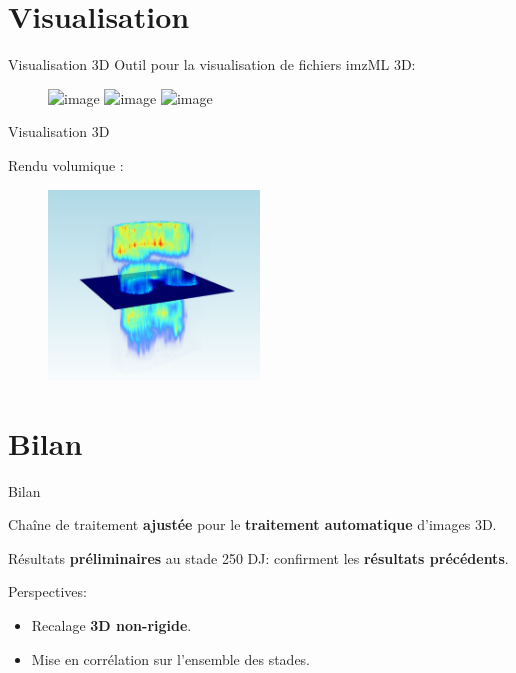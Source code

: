 \documentclass[10pt]{beamer}
\begin{document}
\section{Visualisation}


\begin{frame}{Visualisation 3D}
  Outil pour la visualisation de fichiers imzML 3D:

  \begin{figure}[ht]
    \centering
    \includegraphics<1>[width=0.95\textwidth]{fig/visu}%
    \includegraphics<2>[width=0.95\textwidth]{fig/visu2}%
    \includegraphics<3>[width=0.95\textwidth]{fig/visu3}
    \caption{}
    \label{fig:visu}
  \end{figure}

\end{frame}

\begin{frame}{Visualisation 3D}
  
  Rendu volumique :
  \begin{figure}[ht]
    \centering
    \includegraphics[width=0.5\textwidth]{fig/visu_3d.png}
    \caption{}
    \label{fig:visu_3d.png}
  \end{figure}

\end{frame}




\section{Bilan}

\begin{frame}{Bilan}

  Chaîne de traitement \textbf{ajustée} pour le \textbf{traitement automatique} d'images 3D.

  Résultats \textbf{préliminaires} au stade 250 DJ: confirment les \textbf{résultats précédents}.

  \vspace{0.4cm}

  Perspectives:
  \begin{itemize}
  \item Recalage \textbf{3D non-rigide}.
  \item Mise en corrélation sur l'ensemble des stades.
  \end{itemize}


\end{frame}
\end{document}
